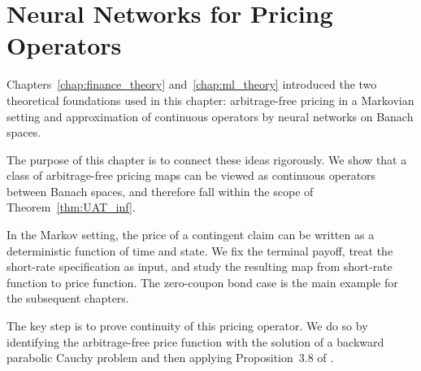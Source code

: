 \chapter{Neural Networks for Pricing Operators}
\label{chap:bridging}
















Chapters~\ref{chap:finance_theory} and~\ref{chap:ml_theory} introduced the two theoretical foundations used in this chapter: arbitrage-free pricing in a Markovian setting and approximation of continuous operators by neural networks on Banach spaces.

The purpose of this chapter is to connect these ideas rigorously. We show that a class of arbitrage-free pricing maps can be viewed as continuous operators between Banach spaces, and therefore fall within the scope of Theorem~\ref{thm:UAT_inf}.

In the Markov setting, the price of a contingent claim can be written as a deterministic function of time and state. We fix the terminal payoff, treat the short-rate specification as input, and study the resulting map from short-rate function to price function. The zero-coupon bond case is the main example for the subsequent chapters.

The key step is to prove continuity of this pricing operator. We do so by identifying the arbitrage-free price function with the solution of a backward parabolic Cauchy problem and then applying Proposition~3.8 of \citet{Benth2024}.

